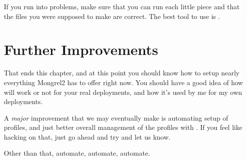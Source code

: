 If you run into problems, make sure that you can run each little
piece and that the files you were supposed to make are correct.
The best tool to use is .

\section{Further Improvements}

That ends this chapter, and at this point you should know how to setup
nearly everything Mongrel2 has to offer right now.  You should have a good
idea of how  will work or not for your real deployments, and
how it's used by me for my own deployments.

A \emph{major} improvement that we may eventually make is automating
setup of  profiles, and just better overall management
of the profiles with .  If you feel like hacking on that,
just go ahead and try and let us know.

Other than that, automate, automate, automate.

